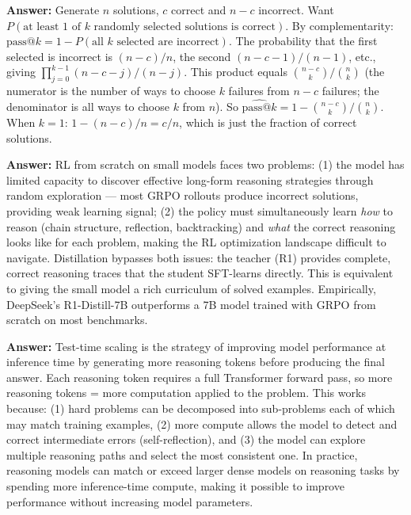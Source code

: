 \documentclass[11pt, a4paper]{article}
\begin{document}
\begin{notebox}
\textbf{Answer:} Generate $n$ solutions, $c$ correct and $n-c$ incorrect. Want $P(\text{at least 1 of } k \text{ randomly selected solutions is correct})$. By complementarity: $\text{pass@}k = 1 - P(\text{all } k \text{ selected are incorrect})$. The probability that the first selected is incorrect is $(n-c)/n$, the second $(n-c-1)/(n-1)$, etc., giving $\prod_{j=0}^{k-1}(n-c-j)/(n-j)$. This product equals $\binom{n-c}{k}/\binom{n}{k}$ (the numerator is the number of ways to choose $k$ failures from $n-c$ failures; the denominator is all ways to choose $k$ from $n$). So $\widehat{\text{pass@}k} = 1 - \binom{n-c}{k}/\binom{n}{k}$. When $k=1$: $1 - (n-c)/n = c/n$, which is just the fraction of correct solutions.
\end{notebox}

\begin{notebox}
\textbf{Answer:} RL from scratch on small models faces two problems: (1) the model has limited capacity to discover effective long-form reasoning strategies through random exploration --- most GRPO rollouts produce incorrect solutions, providing weak learning signal; (2) the policy must simultaneously learn \emph{how} to reason (chain structure, reflection, backtracking) and \emph{what} the correct reasoning looks like for each problem, making the RL optimization landscape difficult to navigate. Distillation bypasses both issues: the teacher (R1) provides complete, correct reasoning traces that the student SFT-learns directly. This is equivalent to giving the small model a rich curriculum of solved examples. Empirically, DeepSeek's R1-Distill-7B outperforms a 7B model trained with GRPO from scratch on most benchmarks.
\end{notebox}

\begin{notebox}
\textbf{Answer:} Test-time scaling is the strategy of improving model performance at inference time by generating more reasoning tokens before producing the final answer. Each reasoning token requires a full Transformer forward pass, so more reasoning tokens = more computation applied to the problem. This works because: (1) hard problems can be decomposed into sub-problems each of which may match training examples, (2) more compute allows the model to detect and correct intermediate errors (self-reflection), and (3) the model can explore multiple reasoning paths and select the most consistent one. In practice, reasoning models can match or exceed larger dense models on reasoning tasks by spending more inference-time compute, making it possible to improve performance without increasing model parameters.
\end{notebox}
\end{document}
